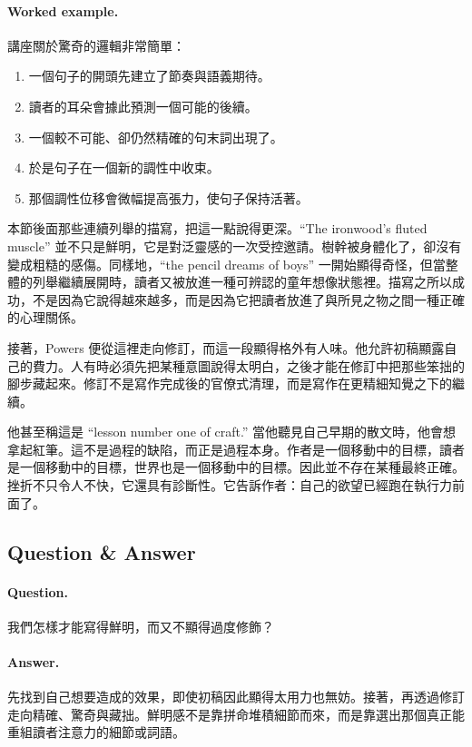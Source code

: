 \paragraph{Worked example.} 講座關於驚奇的邏輯非常簡單：
\begin{enumerate}
\item 一個句子的開頭先建立了節奏與語義期待。
\item 讀者的耳朵會據此預測一個可能的後續。
\item 一個較不可能、卻仍然精確的句末詞出現了。
\item 於是句子在一個新的調性中收束。
\item 那個調性位移會微幅提高張力，使句子保持活著。
\end{enumerate}

本節後面那些連續列舉的描寫，把這一點說得更深。``The ironwood's fluted muscle'' 並不只是鮮明，它是對泛靈感的一次受控邀請。樹幹被身體化了，卻沒有變成粗糙的感傷。同樣地，``the pencil dreams of boys'' 一開始顯得奇怪，但當整體的列舉繼續展開時，讀者又被放進一種可辨認的童年想像狀態裡。描寫之所以成功，不是因為它說得越來越多，而是因為它把讀者放進了與所見之物之間一種正確的心理關係。

接著，Powers 便從這裡走向修訂，而這一段顯得格外有人味。他允許初稿顯露自己的費力。人有時必須先把某種意圖說得太明白，之後才能在修訂中把那些笨拙的腳步藏起來。修訂不是寫作完成後的官僚式清理，而是寫作在更精細知覺之下的繼續。

他甚至稱這是 ``lesson number one of craft.'' 當他聽見自己早期的散文時，他會想拿起紅筆。這不是過程的缺陷，而正是過程本身。作者是一個移動中的目標，讀者是一個移動中的目標，世界也是一個移動中的目標。因此並不存在某種最終正確。挫折不只令人不快，它還具有診斷性。它告訴作者：自己的欲望已經跑在執行力前面了。

\subsection{Question \& Answer}

\paragraph{Question.} 我們怎樣才能寫得鮮明，而又不顯得過度修飾？

\paragraph{Answer.} 先找到自己想要造成的效果，即使初稿因此顯得太用力也無妨。接著，再透過修訂走向精確、驚奇與藏拙。鮮明感不是靠拼命堆積細節而來，而是靠選出那個真正能重組讀者注意力的細節或詞語。

